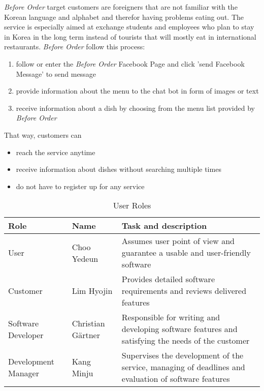  \emph{Before Order} target customers are foreigners that are not familiar with the Korean language and alphabet and therefor having problems eating out. The service is especially aimed at exchange students and employees who plan to stay in Korea in the long term instead of tourists that will mostly eat in international restaurants. \emph{Before Order} follow this process: \newline
 
\begin{enumerate}[label=Step \arabic*:, leftmargin=1.5cm]
\item follow or enter the \emph{Before Order} Facebook Page and click 'send Facebook Message' to send message 
\item provide information about the menu to the chat bot in form of images or text
\item receive information about a dish by choosing from the menu list provided by \emph{Before Order} \newline
\end{enumerate}

That way, customers can 
\begin{itemize}
\item reach the service anytime
\item receive information about dishes without searching multiple times
\item do not have to register up for any service 
\end{itemize}

\begin{table}[htb]
\caption{User Roles}
\begin{tabularx}{\linewidth}{|X|X|X|}
\toprule
Role                & Name              & Task and description \\
\midrule
User                & Choo Yedeun       & Assumes user point of view and guarantee a usable and user-friendly software \\
Customer            & Lim Hyojin        & Provides detailed software requirements and reviews delivered features \\
Software Developer  & Christian Gärtner & Responsible for writing and developing software features and satisfying the needs of the customer\\
Development Manager & Kang Minju        & Supervises the development of the service, managing of deadlines and evaluation of software features
\end{tabularx}
\end{table}
\FloatBarrier